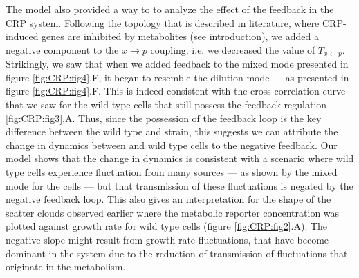 %
%




The model also provided 
a way to to analyze the effect of the feedback in the CRP system.
%
%
Following the topology that is described in literature,
where CRP-induced genes are inhibited by metabolites (see introduction), 
we added a negative component to the $x\rightarrow{p}$ coupling; 
i.e. we decreased the value of $T_{x\leftarrow{p}}$.
%
%
Strikingly, we saw that when we added feedback to the mixed mode presented in figure \ref{fig:CRP:fig4}.E, it began to resemble the dilution mode --- as presented in figure \ref{fig:CRP:fig4}.F.
%
This is indeed consistent with the cross-correlation curve that we saw for the wild type cells that still possess the feedback regulation \ref{fig:CRP:fig3}.A.
%
Thus, since the possession of the feedback loop is the key difference between
the wild type and \dcamp strain, this suggests we can attribute the change in dynamics between \dcamp and wild type cells to the negative feedback.
%
Our model shows that the change in dynamics is consistent with a scenario where wild type cells 
experience fluctuation from many sources --- as shown by the mixed mode for the \dcamp cells ---
but that transmission of these fluctuations is negated by the negative feedback loop. 
%
This also gives an interpretation for the shape of the scatter clouds observed earlier where the metabolic reporter concentration was plotted against growth rate for wild type cells (figure \ref{fig:CRP:fig2}.A).
The negative slope might 
result from growth rate fluctuations, that have become dominant in the system
due to the reduction of transmission of fluctuations that originate in the metabolism.


